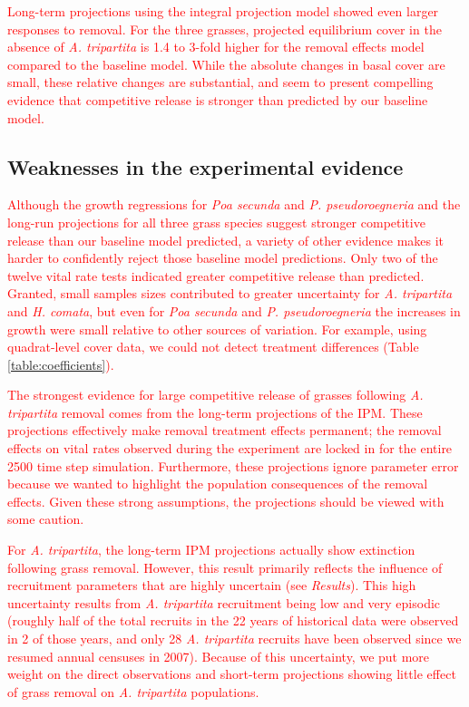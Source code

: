 \documentclass[11pt]{article}
\newcommand{\new}{\textcolor{red}}
\begin{document}
\begin{doublespacing}
\new{Long-term projections using the integral projection model showed even larger responses to removal. For the three grasses, projected equilibrium cover in the absence of \textit{A. tripartita} is 1.4 to 3-fold higher for the removal effects model compared to the baseline model. While the absolute changes in basal cover are small, these relative changes are substantial, and seem to present compelling evidence that competitive release is stronger than predicted by our baseline model.  }

\subsection*{Weaknesses in the experimental evidence}

\new{Although the growth regressions for \textit{Poa secunda} and \textit{P. pseudoroegneria} and the long-run projections for all three grass species suggest stronger competitive release than our baseline model predicted, a variety of other evidence makes it harder to confidently reject those baseline model predictions. Only two of the twelve vital rate tests indicated greater competitive release than predicted. Granted, small samples sizes contributed to greater uncertainty for \textit{A. tripartita} and \textit{H. comata}, but even for \textit{Poa secunda} and \textit{P. pseudoroegneria} the increases in growth were small relative to other sources of variation. For example, using quadrat-level cover data, we could not detect treatment differences (Table \ref{table:coefficients}).  }

\new{The strongest evidence for large competitive release of grasses following \textit{A. tripartita} removal comes from the long-term projections of the IPM. These projections effectively make removal treatment effects permanent; the removal effects on vital rates observed during the experiment are locked in for the entire 2500 time step simulation. Furthermore, these projections ignore parameter error because we wanted to highlight the population consequences of the removal effects. Given these strong assumptions, the projections should be viewed with some caution.  }

\new{For \textit{A. tripartita}, the long-term IPM projections actually show extinction following grass removal.
However, this result primarily reflects the influence of recruitment parameters that are highly uncertain (see \emph{Results}). This high uncertainty results from \textit{A. tripartita} recruitment being low and very episodic (roughly half of the total recruits in the 22 years of historical data were observed in 2 of those years, and only 28 \textit{A. tripartita} recruits have been observed since we resumed annual censuses in 2007). Because of this uncertainty, we put more weight on the direct observations and short-term projections showing little effect of grass removal on \textit{A. tripartita} populations.}


\end{doublespacing}
\end{document}
